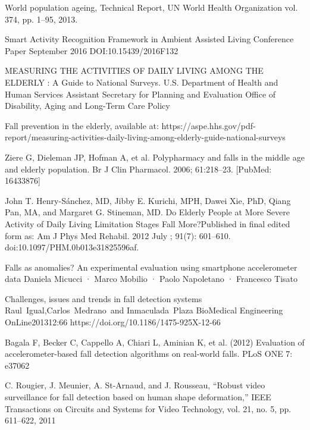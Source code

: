 \documentclass[a4paper, parskip=full]{scrartcl}
\begin{document}
\begin{thebibliography}{9}
	

	

World population ageing, Technical Report, UN World Health
Organization vol. 374, pp. 1–95, 2013.



Smart Activity	Recognition	Framework in Ambient Assisted Living
Conference	Paper September	2016
DOI:10.15439/2016F132


MEASURING THE ACTIVITIES OF DAILY LIVING AMONG THE ELDERLY : A Guide to National Surveys. U.S. Department of Health and Human Services Assistant Secretary for Planning and Evaluation Office of Disability, Aging and Long-Term Care Policy


Fall prevention in the elderly, available at: https://aspe.hhs.gov/pdf-report/measuring-activities-daily-living-among-elderly-guide-national-surveys

Ziere G, Dieleman JP, Hofman A, et al. Polypharmacy and falls in the middle age and elderly
population. Br J Clin Pharmacol. 2006; 61:218–23. [PubMed: 16433876]

John T. Henry-Sánchez, MD, Jibby E. Kurichi, MPH, Dawei Xie, PhD, Qiang Pan, MA, and
Margaret G. Stineman, MD. Do Elderly People at More Severe Activity of Daily Living Limitation Stages Fall More?Published in final edited form as: Am J Phys Med Rehabil. 2012 July ; 91(7): 601–610. doi:10.1097/PHM.0b013e31825596af.


Falls as anomalies? An experimental evaluation using smartphone accelerometer data Daniela Micucci · Marco Mobilio · Paolo Napoletano · Francesco Tisato



Challenges, issues and trends in fall detection systems Raul Igual,Carlos Medrano and
Inmaculada Plaza BioMedical Engineering OnLine201312:66
https://doi.org/10.1186/1475-925X-12-66

Bagala F, Becker C, Cappello A, Chiari L, Aminian K, et al. (2012) Evaluation of accelerometer-based fall detection algorithms on real-world falls. PLoS ONE 7: e37062

C. Rougier, J. Meunier, A. St-Arnaud, and J. Rousseau, “Robust video surveillance for fall detection based on human shape deformation,” IEEE Transactions on Circuits and Systems for Video Technology, vol. 21, no. 5, pp. 611–622, 2011


\end{thebibliography}
\end{document}
